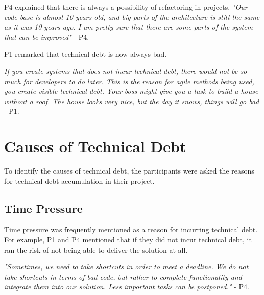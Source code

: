 P4 explained that there is always a possibility of refactoring in projects. \textit{"Our code base is almost 10 years old, and big parts of the architecture is still the same as it was 10 years ago. I am pretty sure that there are some parts of the system that can be improved"} - P4. 

P1 remarked that technical debt is now always bad.
\begin{displayquote}
\textit{If you create systems that does not incur technical debt, there would not be so much for developers to do later. This is the reason for agile methods being used, you create visible technical debt. Your boss might give you a task to build a house without a roof. The house looks very nice, but the day it snows, things will go bad} - P1.
\end{displayquote}






\section{Causes of Technical Debt}
\label{sec:techCause}
To identify the causes of technical debt, the participants were asked the reasons for technical debt accumulation in their project.

\subsection{Time Pressure}
Time pressure was frequently mentioned as a reason for incurring technical debt. For example, P1 and P4 mentioned that if they did not incur technical debt, it ran the risk of not being able to deliver the solution at all. 

\begin{displayquote}
\textit{"Sometimes, we need to take shortcuts in order to meet a deadline. We do not take shortcuts in terms of bad code, but rather to complete functionality and integrate them into our solution. Less important tasks can be postponed."} - P4.
\end{displayquote}


